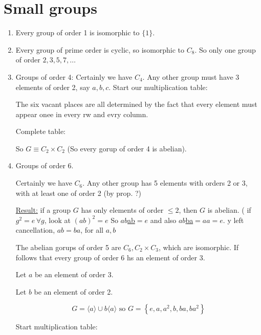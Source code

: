 \documentclass{article}
\theoremstyle{definition}
\begin{document}
\section{Small groups}
\begin{enumerate}
  \item 
  Every group of order 1 is isomorphic to $\{1\}$.
\item Every group of prime order is cyclic, so isomorphic to $C_8$. So only one group of order $2,3,5,7,\ldots$

\item Groups of order 4: Certainly we have $C_4$. Any other group must have 3 elements of order 2, say $a,b,c$. Start our multiplication table:


The six vacant places are all determined by the fact that every element must appear onee in every rw and evry column.

Complete table:

So $G \equiv C_2 \times C_2$ (So every gorup of order 4 is abelian).

\item Groups of order 6.

  Certainly we have $C_6$. Any other group has 5 elements with orders 2 or 3, with at least one of order 2 (by prop. ?)

  \underline{Result:} if a group $G$ has only elements of order $\leq 2$, then $G$ is abelian. ( if $g^2 = e\,\forall g$, look at $(ab)^2 = e$ So $ab$\underline{ab}$=e$ and also $ab$\underline{ba}$=aa=e$. y left cancellation, $ab=ba$, for all $a,b$

  The abelian gorups of order 5 are $C_6, C_2 \times C_3$, which are isomorphic. If follows that every group of order 6 hs an element of order 3.

  Let $a$ be an element of order 3.

  Let $b$ be an element of order 2.

  \begin{equation}
    G = \langle a \rangle \cup b \langle a \rangle \text{ so } G = \left\{ e,a,a^2,b,ba,ba^2 \right\}
    \label{}
  \end{equation}

  Start multiplication table:



\end{enumerate}
\end{document}
